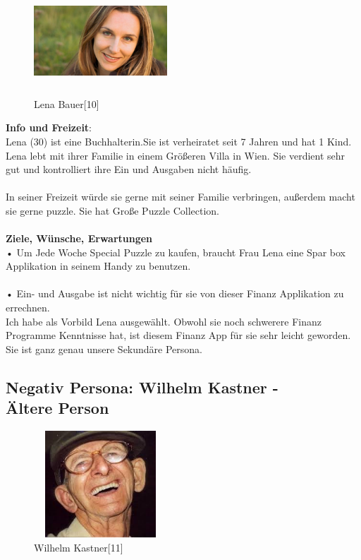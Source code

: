 \documentclass[runningheads,a4paper]{llncs}
\begin{document}
\begin{figure}
\centering
\includegraphics[height=4cm,width=5cm]{lenabauer}
\caption{Lena Bauer[10]}

\end{figure}
                                          
\textbf{Info und Freizeit}: \\
Lena (30) ist eine Buchhalterin.Sie ist verheiratet seit 7 Jahren und hat 1 Kind. Lena lebt mit ihrer Familie in einem Größeren Villa in Wien. Sie verdient sehr gut und kontrolliert ihre Ein und Ausgaben nicht häufig. \\\\
In seiner Freizeit würde sie gerne mit seiner Familie verbringen, außerdem macht sie gerne puzzle. Sie hat Große Puzzle Collection. \\\\



\textbf{ Ziele, Wünsche, Erwartungen}\\

• Um Jede Woche Special Puzzle zu kaufen, braucht Frau Lena eine Spar box Applikation in seinem Handy zu benutzen. \\\\
• Ein- und Ausgabe ist nicht wichtig für sie von dieser Finanz Applikation zu errechnen. \\
Ich habe als Vorbild Lena ausgewählt. Obwohl sie noch schwerere Finanz Programme Kenntnisse hat, ist diesem Finanz App für sie sehr leicht geworden. \\
Sie ist ganz genau unsere Sekundäre Persona.
\clearpage

\subsection{Negativ Persona: Wilhelm Kastner - \\Ältere Person}

\begin{figure}
\centering
\includegraphics[height=4cm,width=5cm]{wilhemkastner}
\caption{Wilhelm Kastner[11]}

\end{figure}
                                          
\end{document}
